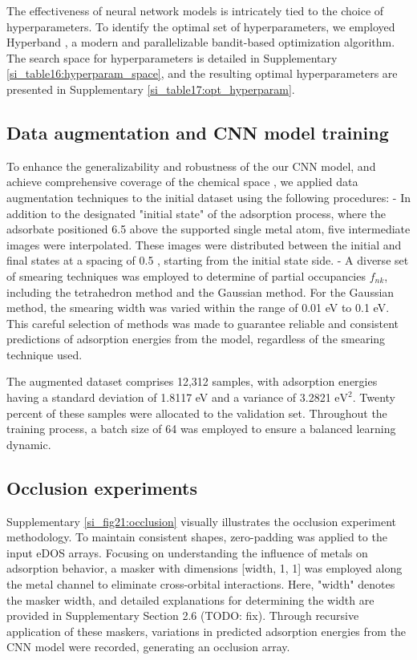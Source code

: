 The effectiveness of neural network models is intricately tied to the choice of hyperparameters.
To identify the optimal set of hyperparameters, we employed Hyperband \cite{li2018hyperband}, a modern and parallelizable bandit-based optimization algorithm.
The search space for hyperparameters is detailed in Supplementary \cref{si_table16:hyperparam_space}, and the resulting optimal hyperparameters are presented in Supplementary \cref{si_table17:opt_hyperparam}.


\subsection{Data augmentation and CNN model training}
To enhance the generalizability and robustness of the our CNN model, and achieve comprehensive coverage of the chemical space \cite{DBLP:journals/corr/abs-2112-12542}, we applied data augmentation techniques to the initial dataset using the following procedures:
	- In addition to the designated "initial state" of the adsorption process, where the adsorbate positioned 6.5 \text{\AA} above the supported single metal atom, five intermediate images were interpolated. These images were distributed between the initial and final states at a spacing of 0.5 \text{\AA}, starting from the initial state side.
	- A diverse set of smearing techniques was employed to determine of partial occupancies $f_{nk}$, including the tetrahedron method \cite{blochl1994improved} and the Gaussian method. For the Gaussian method, the smearing width was varied within the range of 0.01 eV to 0.1 eV. This careful selection of methods was made to guarantee reliable and consistent predictions of adsorption energies from the model, regardless of the smearing technique used.

The augmented dataset comprises 12,312 samples, with adsorption energies having a standard deviation of 1.8117 eV and a variance of 3.2821 $\mathrm{eV}^2$.
Twenty percent of these samples were allocated to the validation set. Throughout the training process, a batch size of 64 was employed to ensure a balanced learning dynamic.


\subsection{Occlusion experiments}
Supplementary \cref{si_fig21:occlusion} visually illustrates the occlusion experiment methodology.
To maintain consistent shapes, zero-padding was applied to the input eDOS arrays.
Focusing on understanding the influence of metals on adsorption behavior, a masker with dimensions [width, 1, 1] was employed along the metal channel to eliminate cross-orbital interactions.
Here, "width" denotes the masker width, and detailed explanations for determining the width are provided in Supplementary Section 2.6 (TODO: fix).
Through recursive application of these maskers, variations in predicted adsorption energies from the CNN model were recorded, generating an occlusion array.


